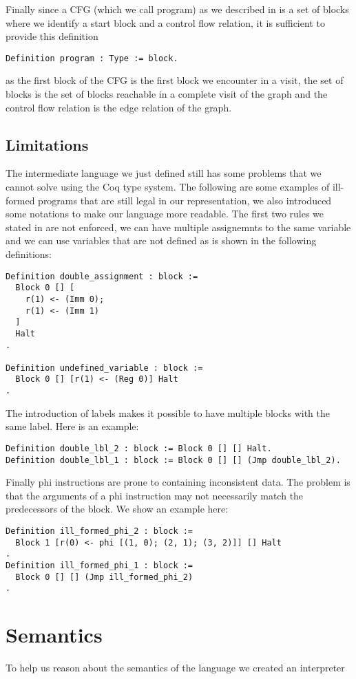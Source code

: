 Finally since a CFG (which we call program) as we described in  is a set of blocks where we identify a start block and a control flow relation, it is sufficient to provide this definition

\begin{lstlisting}[language=Coq]
Definition program : Type := block.
\end{lstlisting} as the first block of the CFG is the first block we encounter in a visit, the set of blocks is the set of blocks reachable in a complete visit of the graph and the control flow relation is the edge relation of the graph.

\subsection{Limitations}
The intermediate language we just defined still has some problems that we cannot solve using the Coq type system. The following are some examples of ill-formed programs that are still legal in our representation, we also introduced some notations to make our language more readable.
The first two rules we stated in  are not enforced, we can have multiple assignemnts to the same variable and we can use variables that are not defined as is shown in the following definitions:

\begin{lstlisting}[language=Coq]
Definition double_assignment : block :=
  Block 0 [] [
    r(1) <- (Imm 0);
    r(1) <- (Imm 1)
  ]
  Halt
.

Definition undefined_variable : block :=
  Block 0 [] [r(1) <- (Reg 0)] Halt
.
\end{lstlisting}

The introduction of labels makes it possible to have multiple blocks with the same label. Here is an example:

\begin{lstlisting}[language=Coq]
Definition double_lbl_2 : block := Block 0 [] [] Halt.
Definition double_lbl_1 : block := Block 0 [] [] (Jmp double_lbl_2).
\end{lstlisting}

Finally phi instructions are prone to containing inconsistent data. The problem is that the arguments of a phi instruction may not necessarily match the predecessors of the block. We show an example here:

\begin{lstlisting}[language=Coq]
Definition ill_formed_phi_2 : block :=
  Block 1 [r(0) <- phi [(1, 0); (2, 1); (3, 2)]] [] Halt
.
Definition ill_formed_phi_1 : block :=
  Block 0 [] [] (Jmp ill_formed_phi_2)
.
\end{lstlisting}


\section{Semantics}

To help us reason about the semantics of the language we created an interpreter
